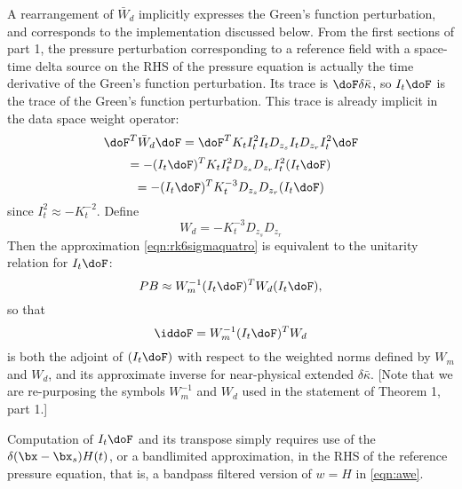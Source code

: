A rearrangement of $\bar{W}_d$ implicitly expresses the Green's
function perturbation, and corresponds to the implementation discussed
below. From the first sections of part 1, the pressure perturbation
corresponding to a reference field with a space-time delta source on
the RHS of the pressure equation is actually the time derivative of
the Green's function perturbation. Its trace is $\doF \delta \bar{\kappa}$, so
$I_t \doF$ is the trace of the Green's function perturbation. This
trace is already implicit in the data space weight operator:
\[
\doF^T \bar{W}_d \doF = \doF^T K_t I_t^2 I_t 
D_{z_s}I_t
D_{z_r}I_t^2 \doF
\]
\[
= -(I_t \doF)^T K_t I_t^2 
D_{z_s}
D_{z_r}I_t^2 (I_t \doF)
\]
\begin{equation}
\label{eqn:wdrearr}
=-(I_t \doF)^T K_t^{-3} 
D_{z_s}
D_{z_r} (I_t \doF)
\end{equation}
since $I_t^2 \approx -K_t^{-2}$. Define 
\begin{equation}
\label{eqn:wdredef}
W_d = -K_t^{-3}D_{z_s}D_{z_r}
\end{equation}
Then the approximation \ref{eqn:rk6sigmaquatro} is equivalent to the
unitarity relation for $I_t\doF$:
\begin{equation}
\label{eqn:rk6sigmaquinze}
PB \approx W_m^{-1} (I_t\doF)^T W_d (I_t \doF), 
\end{equation}
so that 
\begin{equation}
\label{eqn:dddef}
\iddoF = W_m^{-1} (I_t\doF)^T W_d
\end{equation}
is both the adjoint of $(I_t \doF)$ with respect to the weighted norms
defined by $W_m$ and $W_d$, and its approximate inverse for
near-physical extended $\delta \bar{\kappa}$.
[Note that we are re-purposing the symbols $W_m^{-1}$ and $W_d$ used 
in the statement of Theorem 1, part 1.]

Computation of $I_t \doF$ and its transpose simply requires use of the
$\delta(\bx-\bx_s)H(t)$, or a bandlimited approximation, in the RHS of
the reference pressure equation, that is, a bandpass filtered version of $w=H$ in \ref{eqn:awe}.

